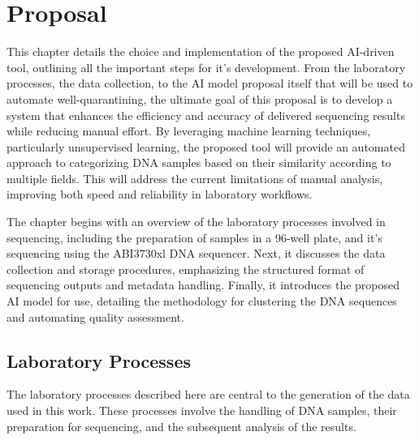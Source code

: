 
%

\makeatletter
\newcommand{\ntifpkgloaded}{%
  \@ifpackageloaded%
}
\makeatother


\chapter{Proposal}
\label{cha:Proposal}


This chapter details the choice and implementation of the proposed AI-driven tool, outlining all the important steps for it's development. From the laboratory processes, the data collection, to the AI model proposal itself that will be used to automate well-quarantining, the ultimate goal of this proposal is to develop a system that enhances the efficiency and accuracy of delivered sequencing results while reducing manual effort. By leveraging machine learning techniques, particularly unsupervised learning, the proposed tool will provide an automated approach to categorizing DNA samples based on their similarity according to multiple fields. This will address the current limitations of manual analysis, improving both speed and reliability in laboratory workflows.

The chapter begins with an overview of the laboratory processes involved in sequencing, including the preparation of samples in a 96-well plate, and it's sequencing using the ABI3730xl DNA sequencer. Next, it discusses the data collection and storage procedures, emphasizing the structured format of sequencing outputs and metadata handling. Finally, it introduces the proposed AI model for use, detailing the methodology for clustering the DNA sequences and automating quality assessment.

\section{Laboratory Processes}
\label{sec:laboratory}

The laboratory processes described here are central to the generation of the data used in this work. These processes involve the handling of DNA samples, their preparation for sequencing, and the subsequent analysis of the results.

